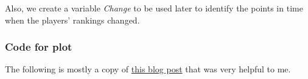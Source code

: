 \documentclass[]{book}
\newenvironment{Shaded}{\begin{snugshade}}{\end{snugshade}}
\newcommand{\DataTypeTok}[1]{\textcolor[rgb]{0.13,0.29,0.53}{#1}}
\newcommand{\DecValTok}[1]{\textcolor[rgb]{0.00,0.00,0.81}{#1}}
\newcommand{\KeywordTok}[1]{\textcolor[rgb]{0.13,0.29,0.53}{\textbf{#1}}}
\newcommand{\NormalTok}[1]{#1}
\newcommand{\OperatorTok}[1]{\textcolor[rgb]{0.81,0.36,0.00}{\textbf{#1}}}
\newcommand{\StringTok}[1]{\textcolor[rgb]{0.31,0.60,0.02}{#1}}
\begin{document}
Also, we create a variable \emph{Change} to be used later to identify the points in time when the players' rankings changed.

\begin{Shaded}
\end{Shaded}

\hypertarget{wtacode}{%
\subsubsection*{Code for plot}\label{wtacode}}

The following is mostly a copy of \href{https://www.r-bloggers.com/bump-chart/}{this blog post} that was very helpful to me.
\end{document}
